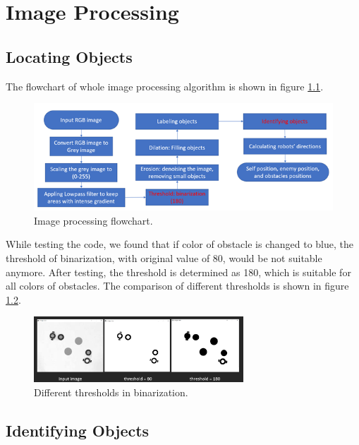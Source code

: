 \chapter{Image Processing}
\label{cha:IP}

\section{Locating Objects}

The flowchart of whole image processing algorithm is shown in figure \ref{IP_flow}.

\begin{figure}[thb]
    \centering
    \includegraphics[width=1\textwidth]{images/Image processing flowchart.png}
    \caption[Image processing flowchart]{Image processing flowchart.}\label{IP_flow}
\end{figure}

While testing the code, we found that if color of obstacle is changed to blue, the threshold of binarization, with original value of 80, would be not suitable anymore. After testing, the threshold is determined as 180, which is suitable for all colors of obstacles. The comparison of different thresholds is shown in figure \ref{different_threshold}.

\begin{figure}[thb]
    \centering
    \includegraphics[width=0.7\textwidth]{images/different_threshold.png}
    \caption[Different thresholds in binarization]{Different thresholds in binarization.}\label{different_threshold}
\end{figure}

\section{Identifying Objects}

